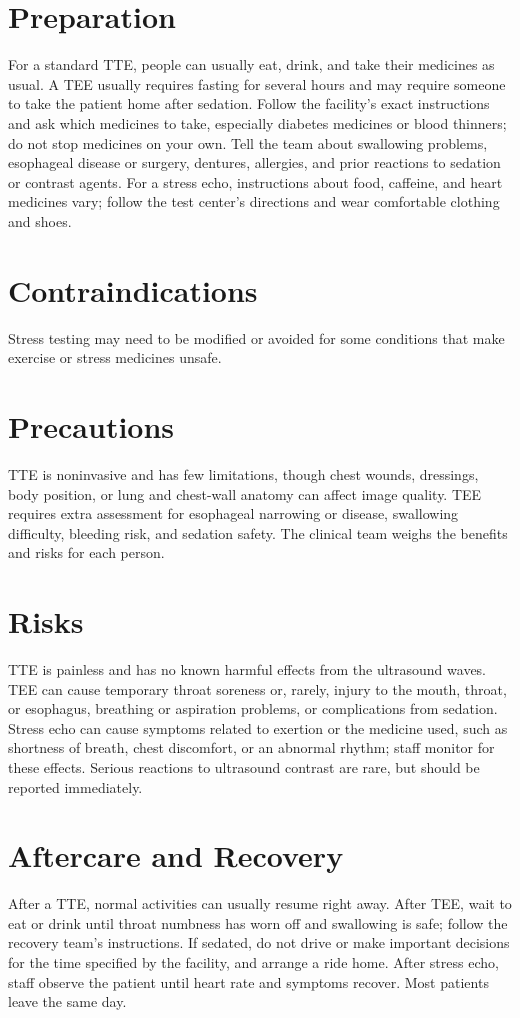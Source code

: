 \section*{Preparation}
For a standard TTE, people can usually eat, drink, and take their medicines as usual. A TEE usually requires fasting for several hours and may require someone to take the patient home after sedation. Follow the facility's exact instructions and ask which medicines to take, especially diabetes medicines or blood thinners; do not stop medicines on your own. Tell the team about swallowing problems, esophageal disease or surgery, dentures, allergies, and prior reactions to sedation or contrast agents. For a stress echo, instructions about food, caffeine, and heart medicines vary; follow the test center's directions and wear comfortable clothing and shoes.

\section*{Contraindications}
Stress testing may need to be modified or avoided for some conditions that make exercise or stress medicines unsafe.

\section*{Precautions}
TTE is noninvasive and has few limitations, though chest wounds, dressings, body position, or lung and chest-wall anatomy can affect image quality. TEE requires extra assessment for esophageal narrowing or disease, swallowing difficulty, bleeding risk, and sedation safety. The clinical team weighs the benefits and risks for each person.

\section*{Risks}
TTE is painless and has no known harmful effects from the ultrasound waves. TEE can cause temporary throat soreness or, rarely, injury to the mouth, throat, or esophagus, breathing or aspiration problems, or complications from sedation. Stress echo can cause symptoms related to exertion or the medicine used, such as shortness of breath, chest discomfort, or an abnormal rhythm; staff monitor for these effects. Serious reactions to ultrasound contrast are rare, but should be reported immediately.

\section*{Aftercare and Recovery}
After a TTE, normal activities can usually resume right away. After TEE, wait to eat or drink until throat numbness has worn off and swallowing is safe; follow the recovery team's instructions. If sedated, do not drive or make important decisions for the time specified by the facility, and arrange a ride home. After stress echo, staff observe the patient until heart rate and symptoms recover. Most patients leave the same day.

